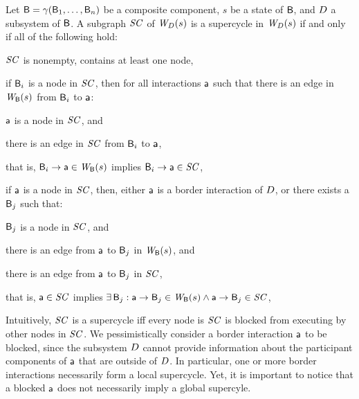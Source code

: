 \begin{definition}
\label{defn:supercycleLoc} 
Let $\B = \gamma(\B_1,\dots,\B_n)$ be a composite component, $s$ be a state of $\B$, and $\DS$ a subsystem
of $\B$.
A subgraph $\SC$ of  $\lwfg{B}{s}{\DS}$ is a supercycle in $\lwfg{B}{s}{\DS}$ if and only if all of the following hold:
\begin{nlst1}
   \item $\SC$ is nonempty, \ie contains at least one node,

   \item if $\B_i$ is a node in $\SC$, then for all interactions $\act$ such that
there is an edge in $\wfg{\B}{s}$ from $\B_i$ to $\act$:
      \begin{nlst2}
      \item $\act$ is a node in $\SC$, and 
      \item there is an edge in $\SC$ from $\B_i$ to $\act$,
      \end{nlst2}
that is, $\B_i \ar \act \in \wfg{\B}{s}$ implies $\B_i \ar \act \in \SC$,

   \item 
if $\act$ is a node in $\SC$, then, either $\act$ is a border interaction of $\DS$, or  there exists a $\B_j$ such that:
      \begin{nlst2}
      \item $\B_j$  is a node in $\SC$, and
      \item there is an edge from $\act$ to $\B_j$ in $\wfg{\B}{s}$, and
      \item there is an edge from $\act$ to $\B_j$ in $\SC$,
      \end{nlst2}
that is, $\act \in \SC$ implies $\ex \B_j : \act \ar \B_j \in \wfg{\B}{s} \land \act \ar \B_j \in \SC$,

\end{nlst1}
\end{definition}
Intuitively, $\SC$ is a supercycle iff every node is $\SC$ is blocked from executing by other nodes in $\SC$. We pessimistically consider a border interaction $\act$ to be blocked, since the subsystem $\DS$ cannot provide information about the participant components of $\act$ that are outside
of $\DS$. In particular, one or more border interactions necessarily form a local supercycle. Yet, it is important to notice that a blocked $\act$ does not necessarily imply a global supercyle.


